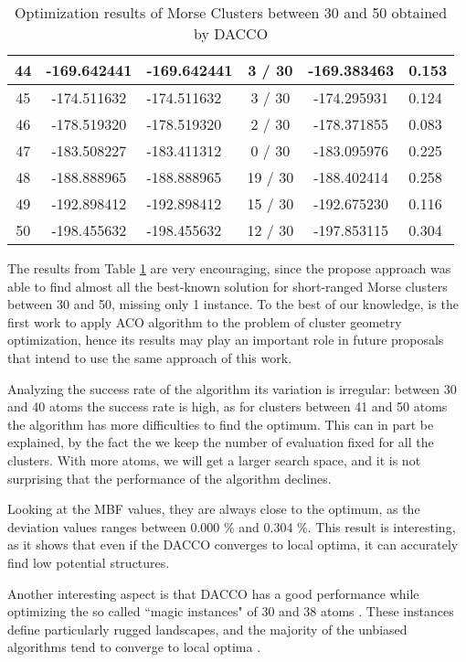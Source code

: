 \begin{table}[!htbp]
\begin{center}
\begin{tabular}{| c | c | p{3cm} | c | c | p{2cm} |}
				44 & -169.642441 & -169.642441 & 3 / 30 & -169.383463 & 0.153 \\ \hline
				45 & -174.511632 & -174.511632 & 3 / 30 & -174.295931 & 0.124 \\ \hline
				46 & -178.519320 & -178.519320 & 2 / 30 & -178.371855 & 0.083 \\ \hline
				47 & -183.508227 & -183.411312 & 0 / 30 & -183.095976 & 0.225 \\ \hline
				48 & -188.888965 & -188.888965 & 19 / 30 & -188.402414 & 0.258 \\ \hline
				49 & -192.898412 & -192.898412 & 15 / 30 & -192.675230 & 0.116 \\ \hline
				50 & -198.455632 & -198.455632 & 12 / 30 & -197.853115 & 0.304 \\ \hline
			\end{tabular}
		\caption{Optimization results of Morse Clusters between 30 and 50 obtained by DACCO}
		\label{tab:optimization_results}
		\end{center}
	\end{table}
	
	The results from Table \ref{tab:optimization_results} are very encouraging, since the propose approach was able to find almost all the best-known solution for short-ranged Morse clusters between 30 and 50, missing only 1 instance.
	To the best of our knowledge, is the first work to apply ACO algorithm to the problem of cluster geometry optimization, hence its results may play an important role in future proposals that intend to use the same approach of this work.
	
	Analyzing the success rate of the algorithm its variation is irregular: between 30 and 40 atoms the success rate is high, as for clusters between 41 and 50 atoms the algorithm has more difficulties to find the optimum. This can in part be explained, by the fact the we keep the number of evaluation fixed for all the clusters. With more atoms, we will get a larger search space, and it is not surprising that the performance of the algorithm declines.
	
	Looking at the MBF values, they are always close to the optimum, as the deviation values ranges between 0.000 \% and 0.304 \%. This result is interesting, as it shows that even if the DACCO converges to local optima, it can accurately find low potential structures.
	
	Another interesting aspect is that DACCO has a good performance while optimizing the so called ``magic instances" of 30 and 38 atoms \cite{doye97}. These instances define particularly rugged landscapes, and the majority of the unbiased algorithms tend to converge to local optima \cite{doye97, grosso07}.
	
